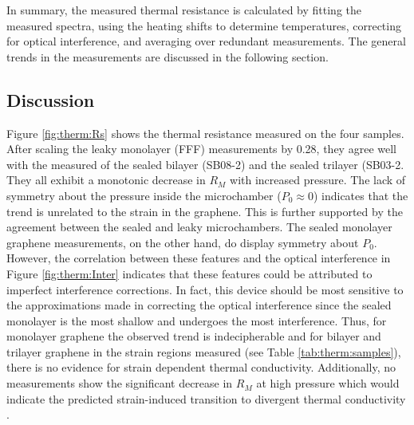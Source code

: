 In summary, the measured thermal resistance is calculated by fitting the measured spectra, using the heating shifts to determine temperatures, correcting for optical interference, and averaging over redundant measurements.
The general trends in the measurements are discussed in the following section.

\subsection{Discussion}
Figure \ref{fig:therm:Rs} shows the thermal resistance measured on the four samples.
After scaling the leaky monolayer (FFF) measurements by 0.28, they agree well with the measured of the sealed bilayer (SB08-2) and the sealed trilayer (SB03-2.
They all exhibit a monotonic decrease in $R_M$ with increased pressure.
The lack of symmetry about the pressure inside the microchamber ($P_0 \approx 0$) indicates that the trend is unrelated to the strain in the graphene.
This is further supported by the agreement between the sealed and leaky microchambers.
The sealed monolayer graphene measurements, on the other hand, do display symmetry about $P_0$.
However, the correlation between these features and the optical interference in Figure \ref{fig:therm:Inter} indicates that these features could be attributed to imperfect interference corrections.
In fact, this device should be most sensitive to the approximations made in correcting the optical interference since the sealed monolayer is the most shallow and undergoes the most interference.
Thus, for monolayer graphene the observed trend is indecipherable and for bilayer and trilayer graphene in the strain regions measured (see Table \ref{tab:therm:samples}), there is no evidence for strain dependent thermal conductivity.
Additionally, no measurements show the significant decrease in $R_M$ at high pressure which would indicate the predicted strain-induced transition to divergent thermal conductivity \cite{Bonini2012,Pereira2013}.

